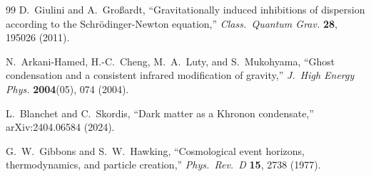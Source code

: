 \documentclass[letterpaper,twocolumn,superscriptaddress,longbibliography]{revtex4-2}
\begin{document}
\begin{thebibliography}{99}
D.~Giulini and A.~Gro{\ss}ardt,
``Gravitationally induced inhibitions of dispersion according
to the Schr\"{o}dinger-Newton equation,''
\textit{Class.\ Quantum Grav.} \textbf{28}, 195026 (2011).


N.~Arkani-Hamed, H.-C.~Cheng, M.~A.~Luty, and S.~Mukohyama,
``Ghost condensation and a consistent infrared modification
of gravity,''
\textit{J.\ High Energy Phys.} \textbf{2004}(05), 074 (2004).

L.~Blanchet and C.~Skordis,
``Dark matter as a Khronon condensate,''
arXiv:2404.06584 (2024).


G.~W.~Gibbons and S.~W.~Hawking,
``Cosmological event horizons, thermodynamics, and particle
creation,''
\textit{Phys.\ Rev.\ D} \textbf{15}, 2738 (1977).

\end{thebibliography}
\end{document}
